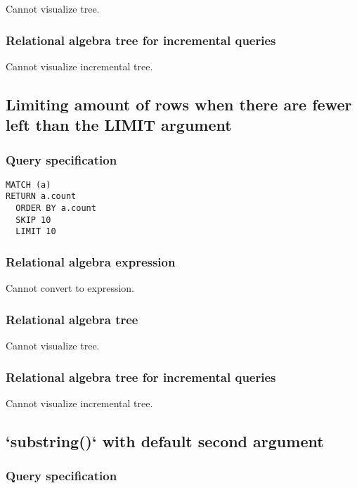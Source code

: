 Cannot visualize tree.

\subsubsection*{Relational algebra tree for incremental queries}

Cannot visualize incremental tree.

\subsection{Limiting amount of rows when there are fewer left than the LIMIT argument}

\subsubsection*{Query specification}

\begin{lstlisting}
MATCH (a)
RETURN a.count
  ORDER BY a.count
  SKIP 10
  LIMIT 10
\end{lstlisting}

\subsubsection*{Relational algebra expression}

Cannot convert to expression.

\subsubsection*{Relational algebra tree}

Cannot visualize tree.

\subsubsection*{Relational algebra tree for incremental queries}

Cannot visualize incremental tree.

\subsection{`substring()` with default second argument}

\subsubsection*{Query specification}

